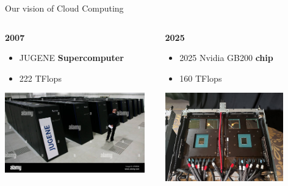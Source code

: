 \documentclass[10pt,aspectratio=1609]{beamer}
\begin{document}
\begin{section}{Our vision of Cloud Computing}
\begin{frame}
  \begin{columns}[T] %
    \begin{column}{0.5\textwidth}
      \textbf{2007}
      \begin{itemize}
        \item JUGENE \textbf{Supercomputer}
        \item 222 TFlops
      \end{itemize}
      \centering
      \includegraphics[width=0.95\textwidth]{supercomputer-jugene.jpg}
    \end{column}
    \begin{column}{0.5\textwidth}
      \textbf{2025}
      \begin{itemize}
        \item 2025 Nvidia GB200 \textbf{chip}
        \item 160 TFlops
      \end{itemize}
      \centering
      \includegraphics[width=0.8\textwidth]{chip-gb200.png}
    \end{column}
  \end{columns}


\end{frame}
\end{section}
\end{document}
